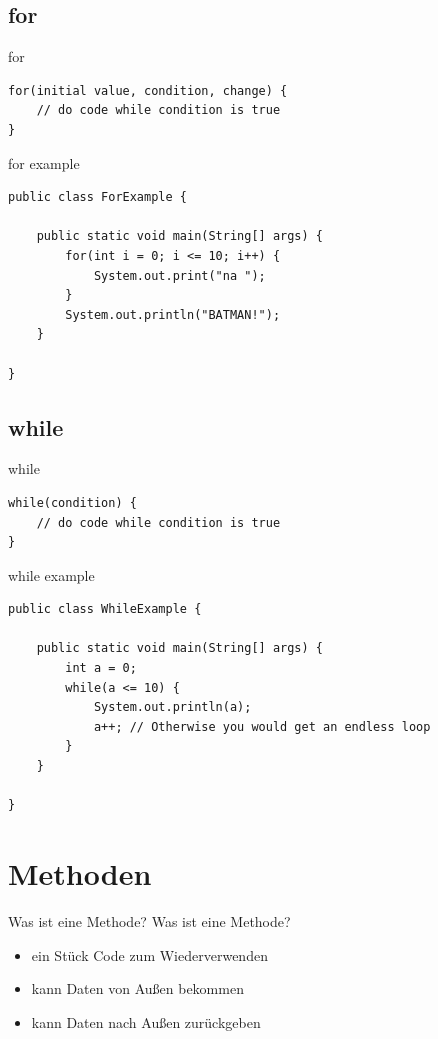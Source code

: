 \subsection{for}
\begin{frame}[fragile]{for}
\begin{lstlisting}
for(initial value, condition, change) {
	// do code while condition is true
}
\end{lstlisting}
\end{frame}

\begin{frame}[fragile]{for example}
\begin{lstlisting}
public class ForExample {

	public static void main(String[] args) {
		for(int i = 0; i <= 10; i++) {
			System.out.print("na ");
		}
		System.out.println("BATMAN!");
	}
    
}
\end{lstlisting}
\end{frame}

\subsection{while}
\begin{frame}[fragile]{while}
\begin{lstlisting}
while(condition) {
	// do code while condition is true
}
\end{lstlisting}
\end{frame}

\begin{frame}[fragile]{while example}
\begin{lstlisting}
public class WhileExample {

	public static void main(String[] args) {
		int a = 0;
		while(a <= 10) {
			System.out.println(a);
            a++; // Otherwise you would get an endless loop
		}
	}
    
}
\end{lstlisting}
\end{frame}

\section{Methoden}
\begin{frame}{Was ist eine Methode?}
	Was ist eine Methode?
	\begin{itemize}
		\item<1-> ein Stück Code zum Wiederverwenden
		\item<2-> kann Daten von Außen bekommen
		\item<3-> kann Daten nach Außen zurückgeben
	\end{itemize}

\end{frame}

